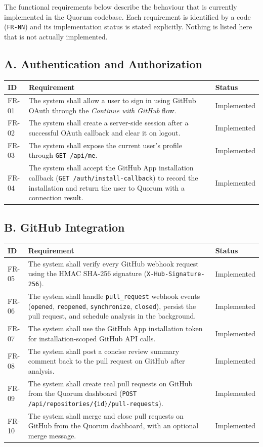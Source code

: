 The functional requirements below describe the behaviour that is currently
implemented in the Quorum codebase. Each requirement is identified by a code
(\texttt{FR-NN}) and its implementation status is stated explicitly. Nothing
is listed here that is not actually implemented.

\subsection{A. Authentication and Authorization}

\begin{longtable}{@{}p{1.4cm}p{11.6cm}p{2.0cm}@{}}
\toprule
\textbf{ID} & \textbf{Requirement} & \textbf{Status} \\
\midrule
\endhead
FR-01 & The system shall allow a user to sign in using GitHub OAuth through the
\emph{Continue with GitHub} flow. & Implemented \\
FR-02 & The system shall create a server-side session after a successful OAuth
callback and clear it on logout. & Implemented \\
FR-03 & The system shall expose the current user's profile through
\texttt{GET /api/me}. & Implemented \\
FR-04 & The system shall accept the GitHub App installation callback
(\texttt{GET /auth/install-callback}) to record the installation and return
the user to Quorum with a connection result. & Implemented \\
\bottomrule
\end{longtable}

\subsection{B. GitHub Integration}

\begin{longtable}{@{}p{1.4cm}p{11.6cm}p{2.0cm}@{}}
\toprule
\textbf{ID} & \textbf{Requirement} & \textbf{Status} \\
\midrule
\endhead
FR-05 & The system shall verify every GitHub webhook request using the HMAC
SHA-256 signature (\texttt{X-Hub-Signature-256}). & Implemented \\
FR-06 & The system shall handle \texttt{pull\_request} webhook events
(\texttt{opened}, \texttt{reopened}, \texttt{synchronize}, \texttt{closed}),
persist the pull request, and schedule analysis in the background. & Implemented \\
FR-07 & The system shall use the GitHub App installation token for
installation-scoped GitHub API calls. & Implemented \\
FR-08 & The system shall post a concise review summary comment back to the pull
request on GitHub after analysis. & Implemented \\
FR-09 & The system shall create real pull requests on GitHub from the Quorum
dashboard (\texttt{POST /api/repositories/\{id\}/pull-requests}). & Implemented \\
FR-10 & The system shall merge and close pull requests on GitHub from the
Quorum dashboard, with an optional merge message. & Implemented \\
\bottomrule
\end{longtable}

